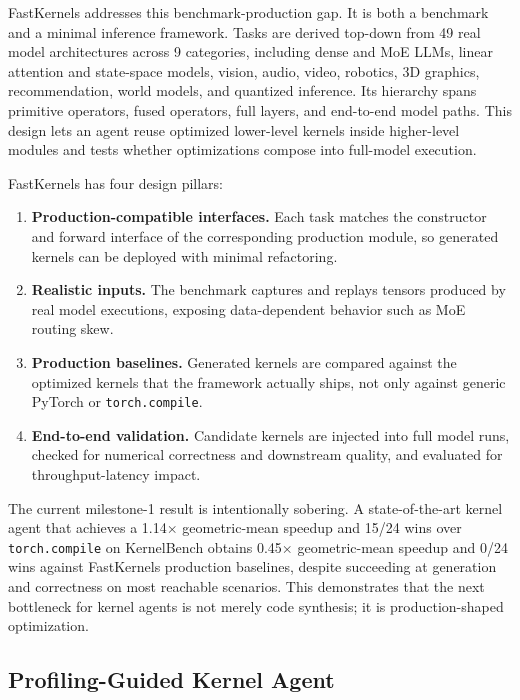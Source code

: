 \documentclass[11pt]{article}
\newcommand{\FastKernels}{FastKernels}
\begin{document}
\FastKernels{} addresses this benchmark-production gap. It is both a benchmark and a minimal inference framework. Tasks are derived top-down from 49 real model architectures across 9 categories, including dense and MoE LLMs, linear attention and state-space models, vision, audio, video, robotics, 3D graphics, recommendation, world models, and quantized inference. Its hierarchy spans primitive operators, fused operators, full layers, and end-to-end model paths. This design lets an agent reuse optimized lower-level kernels inside higher-level modules and tests whether optimizations compose into full-model execution.

\FastKernels{} has four design pillars:

\begin{enumerate}[leftmargin=*, itemsep=2pt]
\item \textbf{Production-compatible interfaces.} Each task matches the constructor and forward interface of the corresponding production module, so generated kernels can be deployed with minimal refactoring.
\item \textbf{Realistic inputs.} The benchmark captures and replays tensors produced by real model executions, exposing data-dependent behavior such as MoE routing skew.
\item \textbf{Production baselines.} Generated kernels are compared against the optimized kernels that the framework actually ships, not only against generic PyTorch or \texttt{torch.compile}.
\item \textbf{End-to-end validation.} Candidate kernels are injected into full model runs, checked for numerical correctness and downstream quality, and evaluated for throughput-latency impact.
\end{enumerate}

The current milestone-1 result is intentionally sobering. A state-of-the-art kernel agent that achieves a 1.14$\times$ geometric-mean speedup and 15/24 wins over \texttt{torch.compile} on KernelBench obtains 0.45$\times$ geometric-mean speedup and 0/24 wins against \FastKernels{} production baselines, despite succeeding at generation and correctness on most reachable scenarios. This demonstrates that the next bottleneck for kernel agents is not merely code synthesis; it is production-shaped optimization.

\subsection{Profiling-Guided Kernel Agent}
\end{document}
